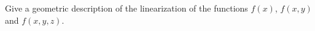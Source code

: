 {
Give a geometric description of the linearization of the functions $f(x)$, $f(x,y)$ and $f(x,y,z)$.
}
{
}
